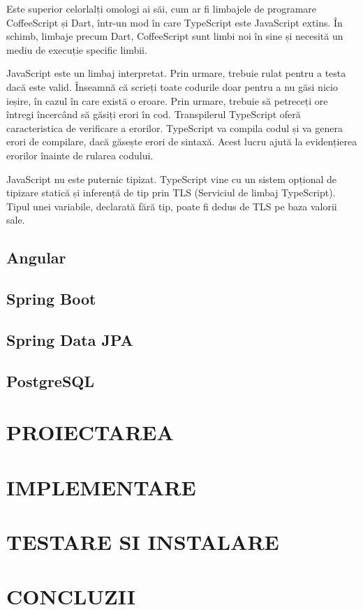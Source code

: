 \documentclass[a4paper,12pt]{article}
\begin{document}
    Este superior celorlalți omologi ai săi, cum ar fi limbajele de programare CoffeeScript și Dart, într-un mod în care TypeScript
    este JavaScript extins. În schimb, limbaje precum Dart, CoffeeScript sunt limbi noi în sine și necesită un mediu de execuție specific limbii.

    JavaScript este un limbaj interpretat. Prin urmare, trebuie rulat pentru a testa dacă este valid. Înseamnă că scrieți toate codurile doar 
    pentru a nu găsi nicio ieșire, în cazul în care există o eroare. Prin urmare, trebuie să petreceți ore întregi încercând să găsiți erori în cod. 
    Transpilerul TypeScript oferă caracteristica de verificare a erorilor. TypeScript va compila codul și va genera erori de compilare, dacă găsește 
    erori de sintaxă. Acest lucru ajută la evidențierea erorilor înainte de rularea codului.

    JavaScript nu este puternic tipizat. TypeScript vine cu un sistem opțional de tipizare statică și inferență de tip prin TLS (Serviciul de limbaj TypeScript). 
    Tipul unei variabile, declarată fără tip, poate fi dedus de TLS pe baza valorii sale.
    \subsection{Angular}
    \subsection{Spring Boot}
    \subsection{Spring Data JPA}
    \subsection{PostgreSQL}
    

    \section{\Large\centering\uppercase{Proiectarea}}

    \section{\Large\centering\uppercase{Implementare}}

    \section{\Large\centering\uppercase{Testare si instalare}}

    \section{\Large\centering\uppercase{Concluzii}}

    \section*{\Large{}}
\end{document}
